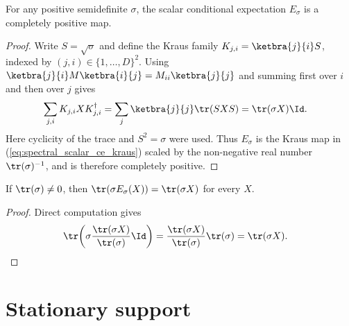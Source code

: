 \begin{lemma}
    \label{thm:scalar_conditional_expectation_isCPMap}
    \leanok
    For any positive semidefinite $\sigma$, the scalar conditional
    expectation $E_\sigma$ is a completely positive map.
\end{lemma}

\begin{proof}\leanok
    Write $S=\sqrt{\sigma}$ and define the Kraus family
    $K_{j,i}=\ketbra{j}{i}S$, indexed by
    $(j,i)\in\{1,\ldots,D\}^2$. Using
    $\ketbra{j}{i}M\ketbra{i}{j}=M_{ii}\ketbra{j}{j}$ and summing first over
    $i$ and then over $j$ gives
    \begin{align}
        \sum_{j,i}K_{j,i}XK_{j,i}^\dagger
        &=\sum_j\ketbra{j}{j}\tr(SXS)
          =\tr(\sigma X)\Id.
        \label{eq:spectral_scalar_ce_kraus}
    \end{align}
    Here cyclicity of the trace and $S^2=\sigma$ were used. Thus
    $E_\sigma$ is the Kraus map in
    (\ref{eq:spectral_scalar_ce_kraus}) scaled by the non-negative real
    number $\tr(\sigma)^{-1}$, and is therefore completely positive.
\end{proof}

\begin{lemma}
    \label{thm:scalar_conditional_expectation_preserves_weighted_trace}
    \leanok
    If $\tr(\sigma)\neq0$, then
    $\tr(\sigma E_\sigma(X))=\tr(\sigma X)$ for every $X$.
\end{lemma}

\begin{proof}\leanok
    Direct computation gives
    \begin{align}
        \tr\!\left(\sigma\frac{\tr(\sigma X)}{\tr(\sigma)}\Id\right)
        &=\frac{\tr(\sigma X)}{\tr(\sigma)}\tr(\sigma)
          =\tr(\sigma X).
        \notag
    \end{align}
\end{proof}

\section{Stationary support}

